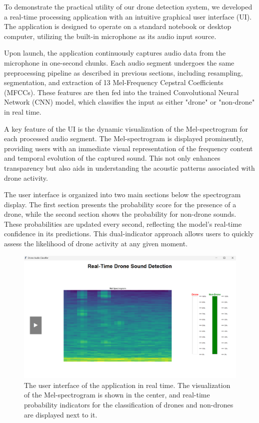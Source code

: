 \documentclass[12pt]{article}
\begin{document}
\vspace{0.2em}

{\fontsize{9}{11}\selectfont
To demonstrate the practical utility of our drone detection system, we developed a real-time processing application with an intuitive graphical user interface (UI). The application is designed to operate on a standard notebook or desktop computer, utilizing the built-in microphone as its audio input source.

Upon launch, the application continuously captures audio data from the microphone in one-second chunks. Each audio segment undergoes the same preprocessing pipeline as described in previous sections, including resampling, segmentation, and extraction of 13 Mel-Frequency Cepstral Coefficients (MFCCs). These features are then fed into the trained Convolutional Neural Network (CNN) model, which classifies the input as either "drone" or "non-drone" in real time.

A key feature of the UI is the dynamic visualization of the Mel-spectrogram for each processed audio segment. The Mel-spectrogram is displayed prominently, providing users with an immediate visual representation of the frequency content and temporal evolution of the captured sound. This not only enhances transparency but also aids in understanding the acoustic patterns associated with drone activity.

The user interface is organized into two main sections below the spectrogram display. The first section presents the probability score for the presence of a drone, while the second section shows the probability for non-drone sounds. These probabilities are updated every second, reflecting the model’s real-time confidence in its predictions. This dual-indicator approach allows users to quickly assess the likelihood of drone activity at any given moment.

\begin{figure}[ht]
\centering
\includegraphics[width=\linewidth]{ui.png}
\caption{The user interface of the application in real time. The visualization of the Mel-spectrogram is shown in the center, and real-time probability indicators for the classification of drones and non-drones are displayed next to it.}
\label{fig:mel_spectrograms}
\end{figure}

}
\end{document}
